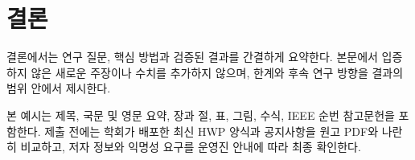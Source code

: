 \section{결론}

결론에서는 연구 질문, 핵심 방법과 검증된 결과를 간결하게 요약한다. 본문에서 입증하지 않은 새로운 주장이나 수치를 추가하지 않으며, 한계와 후속 연구 방향을 결과의 범위 안에서 제시한다.

본 예시는 제목, 국문 및 영문 요약, 장과 절, 표, 그림, 수식, IEEE 순번 참고문헌을 포함한다. 제출 전에는 학회가 배포한 최신 HWP 양식과 공지사항을 원고 PDF와 나란히 비교하고, 저자 정보와 익명성 요구를 운영진 안내에 따라 최종 확인한다.
